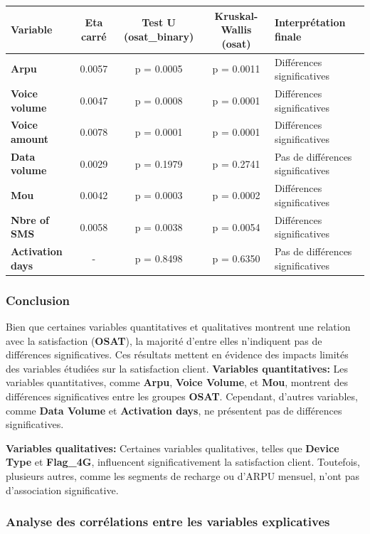 \begin{longtable}{|l|c|c|c|p{3cm}|}
\hline
\textbf{Variable} & \textbf{Eta carré} & \textbf{Test U (osat\_binary)} & \textbf{Kruskal-Wallis (osat)} &  \textbf{Interprétation finale} \\ 
\hline
\textbf{Arpu} & 0.0057 & p = 0.0005 & p = 0.0011 & Différences significatives \\ 
\hline
\textbf{Voice volume} & 0.0047 & p = 0.0008 & p = 0.0001  & Différences significatives \\ 
\hline
\textbf{Voice amount} & 0.0078 & p = 0.0001 & p = 0.0001  & Différences significatives \\ 
\hline
\textbf{Data volume} & 0.0029 & p = 0.1979 & p = 0.2741  & Pas de différences significatives \\ 
\hline
\textbf{Mou} & 0.0042 & p = 0.0003 & p = 0.0002  & Différences significatives \\ 
\hline
\textbf{Nbre of SMS} & 0.0058 & p = 0.0038 & p = 0.0054 & Différences significatives \\ 
\hline
\textbf{Activation days} & - & p = 0.8498 & p = 0.6350  & Pas de différences significatives \\ 
\hline
\end{longtable}

\subsubsection*{Conclusion }
Bien que certaines variables quantitatives et qualitatives montrent une relation avec la satisfaction (\textbf{OSAT}), la majorité d'entre elles n'indiquent pas de différences significatives. Ces résultats mettent en évidence des impacts limités des variables étudiées sur la satisfaction client.
\textbf{Variables quantitatives:} Les variables quantitatives, comme \textbf{Arpu}, \textbf{Voice Volume}, et \textbf{Mou}, montrent des différences significatives entre les groupes \textbf{OSAT}. Cependant, d'autres variables, comme \textbf{Data Volume} et \textbf{Activation days}, ne présentent pas de différences significatives.

\textbf{Variables qualitatives:} Certaines variables qualitatives, telles que \textbf{Device Type} et \textbf{Flag\_4G}, influencent significativement la satisfaction client. Toutefois, plusieurs autres, comme les segments de recharge ou d'ARPU mensuel, n'ont pas d'association significative.

\subsubsection{Analyse des corrélations entre les variables explicatives}
